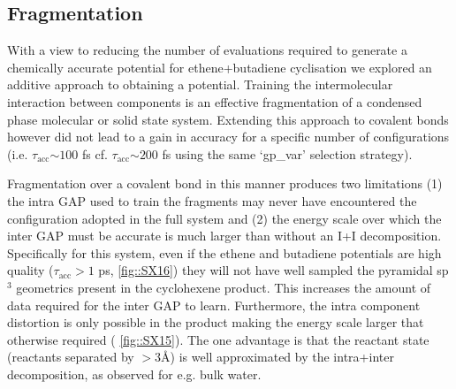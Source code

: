 \documentclass[11pt]{article}
\numberwithin{equation}{subsection}
\newcommand{\tacc}{$\tau_\text{acc}$}
\newcommand{\comment}[1]{}
\begin{document}
\clearpage
\subsection{Fragmentation}  \label{section::SI_ethene_butadiene_fragmentation}

\comment{
	TJW: The graph goes to 100, but you stop at 60. Are you going to add more t_acc for n_eval > 60?
	TY: Nope
	
	TJW: Is it worth having a graphical comparison between the t_accs for doing the I+I decomposition vs not doing it?
	TY: I hate bar charts, what do other people think?
}

With a view to reducing the number of evaluations required to generate a chemically accurate potential for ethene+butadiene cyclisation we explored an additive approach to obtaining a potential. Training the intermolecular interaction between components is an effective fragmentation of a condensed phase molecular\cite{gaptrain2021} or solid state system.\cite{Wengert2021} Extending this approach to covalent bonds however did not lead to a  gain in accuracy for a specific number of configurations (i.e. \tacc $\sim 100$ fs cf. \tacc $\sim 200$ fs using the same `gp\_var' selection strategy).

Fragmentation over a covalent bond in this manner produces two limitations (1) the intra GAP used to train the fragments may never have encountered the configuration adopted in the full system and (2) the energy scale over which the inter GAP must be accurate is much larger than without an I+I decomposition. Specifically for this system, even if the ethene and butadiene potentials are high quality ($\tau_\text{acc} > 1$ ps, \figurename{ \ref{fig::SX16}}) they will not have well sampled the pyramidal sp${}^3$ geometrics present in the  cyclohexene product. This increases the amount of data required for the inter GAP to learn. Furthermore, the intra component distortion is only possible in the product making the energy scale larger that otherwise required (\figurename{ \ref{fig::SX15}}). The one advantage is that the reactant state (reactants separated by $> 3$\AA) is well approximated by the intra+inter decomposition, as observed for e.g. bulk water.
\end{document}
